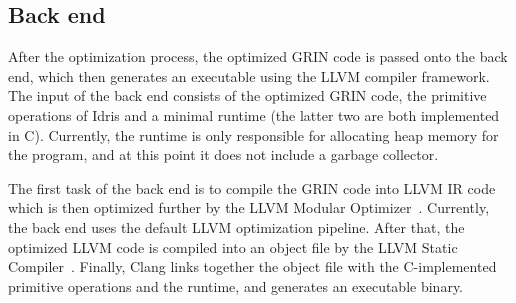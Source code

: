 \documentclass[main.tex]{subfiles}
\begin{document}
	\subsection{Back end}
	\label{subsec:llvm-back-end}
	
	After the optimization process, the optimized GRIN code is passed onto the back end, which then generates an executable using the LLVM compiler framework. The input of the back end consists of the optimized GRIN code, the primitive operations of Idris and a minimal runtime (the latter two are both implemented in C). Currently, the runtime is only responsible for allocating heap memory for the program, and at this point it does not include a garbage collector.
	
	The first task of the back end is to compile the GRIN code into LLVM IR code which is then optimized further by the LLVM Modular Optimizer~\cite{opt}. Currently, the back end uses the default LLVM optimization pipeline. After that, the optimized LLVM code is compiled into an object file by the LLVM Static Compiler~\cite{llc}. Finally, Clang links together the object file with the C-implemented primitive operations and the runtime, and generates an executable binary.
	
\end{document}
